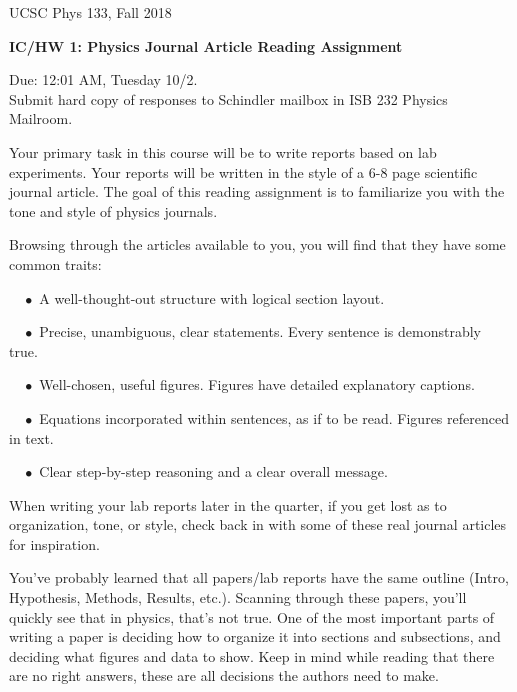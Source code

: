 \documentclass[12pt]{article}
\newcommand{\qspace}{\vskip15pt}
\newcommand{\hqspace}{\vskip5pt}
\begin{document}
\begin{flushright}
UCSC Phys 133, Fall 2018\\
\end{flushright}

\begin{center}
\noindent  \textbf{ \large IC/HW 1: Physics Journal Article Reading Assignment}

Due: 12:01 AM, Tuesday 10/2. \\
Submit hard copy of responses to Schindler mailbox in ISB 232 Physics Mailroom.
\end{center}


Your primary task in this course will be to write reports based on lab experiments. Your reports will be written in the style of a 6-8 page scientific journal article. The goal of this reading assignment is to familiarize you with the tone and style of physics journals.

\hqspace

Browsing through the articles available to you, you will find that they have some common traits:

$\quad \bullet$ A well-thought-out structure with logical section layout.

$\quad \bullet$ Precise, unambiguous, clear statements. Every sentence is demonstrably true.

$\quad \bullet$ Well-chosen, useful figures. Figures have detailed explanatory captions.

$\quad \bullet$ Equations incorporated within sentences, as if to be read. Figures referenced in text.

$\quad \bullet$ Clear step-by-step reasoning and a clear overall message.

When writing your lab reports later in the quarter, if you get lost as to organization, tone, or style, check back in with some of these real journal articles for inspiration.

\hqspace

You've probably learned that all papers/lab reports have the same outline (Intro, Hypothesis, Methods, Results, etc.). Scanning through these papers, you'll quickly see that in physics, that's not true. One of the most important parts of writing a paper is deciding how to organize it into sections and subsections, and deciding what figures and data to show. Keep in mind while reading that there are no right answers, these are all decisions the authors need to make.

\qspace
\end{document}
